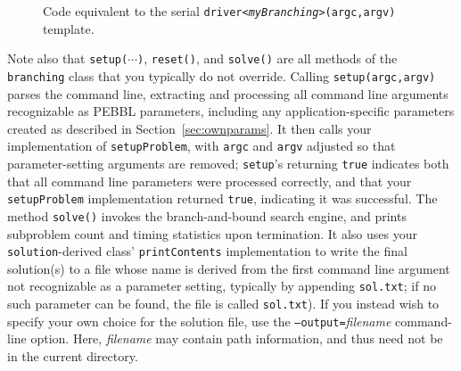 \begin{figure}[tbp]
\begin{center}
\end{center}
\vspace{-2ex}
\caption{Code equivalent to the serial
  \texttt{driver<\emph{myBranching}>(argc,argv)} template.}
\label{fig:serialdriver}
\end{figure}
Note also that \texttt{setup($\cdots$)}, \texttt{reset()}, and
\texttt{solve()} are all methods of the \texttt{branching} class that
you typically do not override.  Calling \texttt{setup(argc,argv)}
parses the command line, extracting and processing all command line
arguments recognizable as PEBBL parameters, including any 
application-specific parameters created as described in 
Section~\ref{sec:ownparams}.  It then calls your
implementation of \texttt{setupProblem}, with \texttt{argc} and
\texttt{argv} adjusted so that parameter-setting arguments are
removed; \texttt{setup}'s returning \texttt{true} indicates both that
all command line parameters were processed correctly, and that your
\texttt{setupProblem} implementation returned \texttt{true},
indicating it was successful.  The method \texttt{solve()} invokes the
branch-and-bound search engine, and prints subproblem count and timing
statistics upon termination.  It also uses your
\texttt{solution}-derived class' \texttt{printContents} implementation
to write the final solution(s) to a file whose name is derived from
the first command line argument not recognizable as a parameter
setting, typically by appending \texttt{sol.txt}; if no such parameter
can be found, the file is called \texttt{sol.txt}).  If you instead
wish to specify your own choice for the solution file, use the
\texttt{--output=}\emph{filename} command-line option.  Here,
\emph{filename} may contain path information, and thus need not be in
the current directory.

